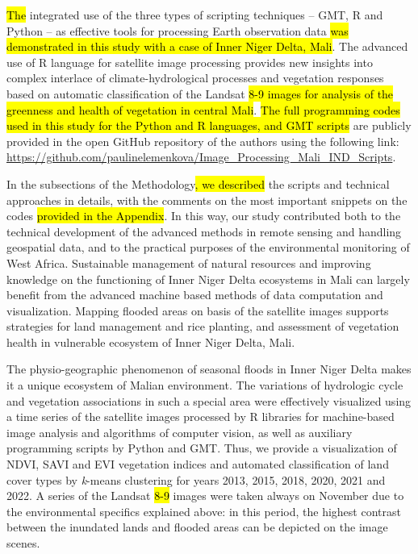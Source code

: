 \documentclass[12pt,a4paper,oneside]{article}
\def \newpar{\vspace{6pt}}
\begin{document}
\newpar \hl{The} integrated use of the three types of scripting techniques -- GMT, R and Python -- as effective tools for processing Earth observation data \hl{was demonstrated in this study with a case of Inner Niger Delta, Mali}. The advanced use of R language for satellite image processing provides new insights into complex interlace of climate-hydrological processes and vegetation responses based on automatic classification of the Landsat \hl{8-9 images for analysis of the greenness and health of vegetation in central Mali}. \hl{The full programming codes used in this study for the Python and R languages, and GMT scripts} are publicly provided in the open GitHub repository of the authors using the following link: \href{https://github.com/paulinelemenkova/Image_Processing_Mali_IND_Scripts}{https://github.com/paulinelemenkova/Image\_Processing\_Mali\_IND\_Scripts}. 

\newpar In the subsections of the Methodology\hl{, we described} the scripts and technical approaches in details, with the comments on the most important snippets on the codes \hl{provided in the Appendix}. In this way, our study contributed both to the technical development of the advanced methods in remote sensing and handling geospatial data, and to the practical purposes of the environmental monitoring of West Africa. Sustainable management of natural resources and improving knowledge on the functioning of Inner Niger Delta ecosystems in Mali can largely benefit from the advanced machine based methods of data computation and visualization. Mapping flooded areas on basis of the satellite images supports strategies for land management and rice planting, and assessment of vegetation health in vulnerable ecosystem of Inner Niger Delta, Mali. 

\newpar The physio-geographic phenomenon of seasonal floods in Inner Niger Delta makes it a unique ecosystem of Malian environment. The variations of hydrologic cycle and vegetation associations in such a special area were effectively visualized using a time series of the satellite images processed by R libraries for machine-based image analysis and  algorithms of computer vision, as well as auxiliary programming scripts by Python and GMT. Thus, we provide a visualization of NDVI, SAVI and EVI vegetation indices and automated classification of land cover types by \emph{k}-means clustering for years 2013, 2015, 2018, 2020, 2021 and 2022. A series of the Landsat \hl{8-9} images were taken always on November due to the environmental specifics explained above: in this period, the highest contrast between the inundated lands and flooded areas can be depicted on the image scenes. 
\end{document}
